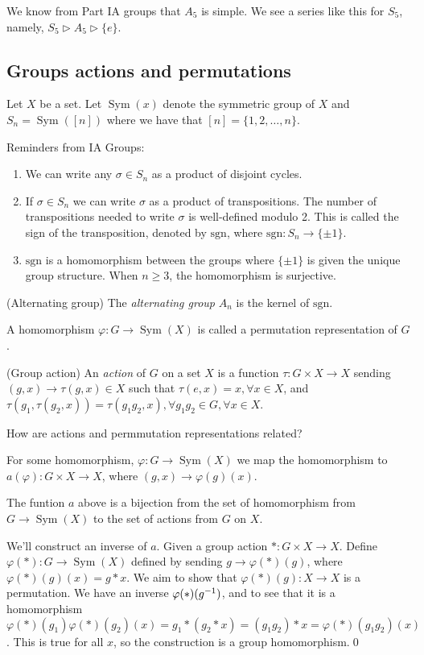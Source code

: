 \documentclass{article}
\DeclareMathOperator{\sym}{Sym}
\begin{document}
\par
 We know from Part IA groups that $ A_5 $ is simple. We see a series like this for $ S_5 $, namely, $ S_5\triangleright A_5\triangleright \{e\} $.
 \subsection{Groups actions and permutations}

\begin{definition}
	Let $ X $ be a set. Let $ \sym(x) $ denote the symmetric group of $ X $ and $ S_n=\sym([n]) $ where we have that $ [n]=\{1,2,\dots, n\} $.
\end{definition}
Reminders from IA Groups:
\begin{enumerate}
	\item We can write any $ \sigma\in S_n $ as a product of disjoint cycles.
	\item If $ \sigma \in S_n $ we can write $ \sigma $ as a product of transpositions. The number of transpositions needed to write $ \sigma $ is well-defined modulo 2. This is called the sign of the transposition, denoted by $ \mathrm {sgn} $, where $ \mathrm{sgn}: S_n\to \{\pm 1\} $.
	\item $ \mathrm{sgn} $ is a homomorphism between the groups where $ \{\pm 1\} $ is given the unique group structure. When $ n\ge 3 $, the homomorphism is surjective.
\end{enumerate}
\begin{definition}
	(Alternating group) The \textit{alternating group} $ A_n $ is the kernel of $ \mathrm{sgn} $.
\end{definition}
A homomorphism $ \varphi: G\to \sym(X) $ is called a permutation representation of $ G $.
\begin{definition}
	(Group action) An \textit{action} of $ G $ on a set $ X $ is a function $ \tau:G\times X\to X $ sending $ (g,x) \to \tau(g,x)\in X $ such that $ \tau(e,x)=x, \forall x\in X $, and $ \tau(g_1,\tau(g_2,x))=\tau(g_1g_2,x), \forall g_1g_2\in G, \forall x\in X $.
\end{definition}
How are actions and permmutation representations related?

For some homomorphism, $ \varphi: G\to\sym(X) $ we map the homomorphism to $ a(\varphi):G\times X\to X $, where $ (g,x)\to\varphi(g)(x) $.
\begin{proposition}
  The funtion $ a $ above is a bijection from the set of homomorphism from $ G\to\sym(X) $ to the set of actions from $ G $ on $ X $.
\end{proposition}
\pf We'll construct an inverse of $ a $. Given a group action $ *:G\times X \to X $. Define $ \varphi(*): G\to \sym(X) $ defined by sending $ g\to\varphi(*)(g) $, where $ \varphi(*)(g)(x)=g*x $. We aim to show that $ \varphi(*)(g):X\to X $ is a permutation. We have an inverse $ \varphi(*)({g}^{-1}) $, and to see that it is a homomorphism $ \varphi(*)(g_1)\varphi(*)(g_2)(x)=g_1*(g_2*x)=(g_1g_2)*x=\varphi(*)(g_1g_2)(x) $. This is true for all $ x $, so the construction is a group homomorphism.\qed
\end{document}
